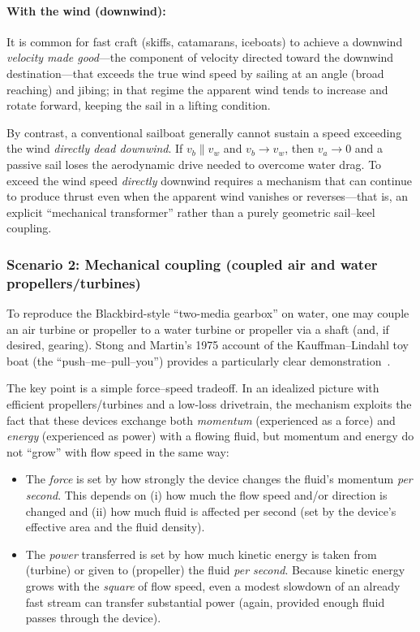 \documentclass[reprint,aps,pra,longbibliography]{revtex4-2}
\begin{document}
\paragraph*{With the wind (downwind):}
It is common for fast craft (skiffs, catamarans, iceboats) to achieve a downwind
\emph{velocity made good}---the component of velocity directed toward the downwind destination---that exceeds the true wind speed by sailing at
an angle (broad reaching) and jibing; in that regime the apparent wind tends to
increase and rotate forward, keeping the sail in a lifting condition.

By contrast, a conventional sailboat generally cannot sustain a speed exceeding
the wind \emph{directly dead downwind}.  If $v_b \parallel v_w$
and $v_b \to v_w$, then $v_a \to 0$ and a passive sail loses
the aerodynamic drive needed to overcome water drag.  To exceed the wind speed
\emph{directly} downwind requires a mechanism that can continue to produce thrust
even when the apparent wind vanishes or reverses---that is, an explicit
``mechanical transformer'' rather than a purely geometric sail--keel coupling.

\subsubsection{Scenario 2: Mechanical coupling (coupled air and water propellers/turbines)}

To reproduce the Blackbird-style ``two-media gearbox'' on water, one may couple
an air turbine or propeller to a water turbine or propeller via a shaft (and,
if desired, gearing).  Stong and Martin's 1975 account of the Kauffman--Lindahl toy boat
(the ``push--me--pull--you'') provides a particularly clear
demonstration~\cite{Stong1975}.

The key point is a simple force--speed tradeoff.  In an idealized picture with
efficient propellers/turbines and a low-loss drivetrain, the mechanism exploits
the fact that these devices exchange both \emph{momentum} (experienced as a
force) and \emph{energy} (experienced as power) with a flowing fluid, but
momentum and energy do not ``grow'' with flow speed in the same way:

\begin{itemize}
\item The \emph{force} is set by how strongly the device changes the fluid's
momentum \emph{per second}.  This depends on (i) how much the flow speed and/or
direction is changed and (ii) how much fluid is affected per second (set by the
device's effective area and the fluid density).

\item The \emph{power} transferred is set by how much kinetic energy is taken
from (turbine) or given to (propeller) the fluid \emph{per second}.  Because
kinetic energy grows with the \emph{square} of flow speed, even a modest
slowdown of an already fast stream can transfer substantial power (again,
provided enough fluid passes through the device).
\end{itemize}
\end{document}
